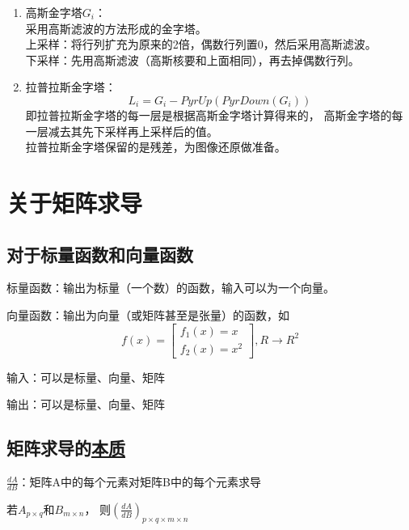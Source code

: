 \documentclass[AutoFakeBold]{MyFormat}
\begin{document}
\begin{enumerate}
    \item 高斯金字塔$G_i$：\\
    采用高斯滤波的方法形成的金字塔。\\
    上采样：将行列扩充为原来的2倍，偶数行列置0，然后采用高斯滤波。\\
    下采样：先用高斯滤波（高斯核要和上面相同），再去掉偶数行列。
    \item 拉普拉斯金字塔：
    \begin{equation}
        L_i=G_i-PyrUp(PyrDown(G_i))
    \end{equation}
    即拉普拉斯金字塔的每一层是根据高斯金字塔计算得来的，
    高斯金字塔的每一层减去其先下采样再上采样后的值。\\
    拉普拉斯金字塔保留的是残差，为图像还原做准备。
\end{enumerate}

\section{关于矩阵求导}

\subsection{对于标量函数和向量函数}
\par 标量函数：输出为标量（一个数）的函数，输入可以为一个向量。
\par 向量函数：输出为向量（或矩阵甚至是张量）的函数，如
\begin{equation}
    f(x)=
    \begin{bmatrix}
        f_1(x)=x\\f_2(x)=x^2
    \end{bmatrix}, R \to R^2
\end{equation}

\par 输入：可以是标量、向量、矩阵
\par 输出：可以是标量、向量、矩阵

\subsection{矩阵求导的\textbf{\Large \underline{本质}}}

\par $\frac{dA}{dB}$：矩阵A中的每个元素对矩阵B中的每个元素求导
\par 若$A_{p\times q}$和$B_{m\times n}$，
则$(\frac{dA}{dB})_{p\times q\times m\times n}$
\end{document}
